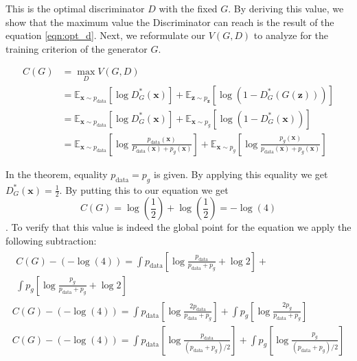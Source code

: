This is the optimal discriminator $D$ with the fixed $G$. By deriving this value, we show that the
maximum value the Discriminator can reach is the result of the equation \ref{eqn:opt_d}. Next, we reformulate our
$V(G, D)$ to analyze for the training criterion of the generator $G$. 

\begin{align}
    C(G) &= \max _{D} V(G, D) \\[5pt]
    & =\mathbb{E}_{\boldsymbol{x} \sim p_{\mathrm{data}}}\left[\log D_{G}^{*}(\boldsymbol{x})\right]+\mathbb{E}_{\boldsymbol{z} \sim p_{\boldsymbol{z}}}\left[\log \left(1-D_{G}^{*}(G(\boldsymbol{z}))\right)\right] \\[5pt]
    & =\mathbb{E}_{\boldsymbol{x} \sim p_{\mathrm{data}}}\left[\log D_{G}^{*}(\boldsymbol{x})\right]+\mathbb{E}_{\boldsymbol{x} \sim p_{g}}\left[\log \left(1-D_{G}^{*}(\boldsymbol{x})\right)\right] \\[5pt]
    & =\mathbb{E}_{\boldsymbol{x} \sim p_{\mathrm{data}}}\left[\log \frac{p_{\mathrm{data}}(\boldsymbol{x})}{P_{\mathrm{data}}(\boldsymbol{x})+p_{g}(\boldsymbol{x})}\right]+\mathbb{E}_{\boldsymbol{x} \sim p_{g}}\left[\log \frac{p_{g}(\boldsymbol{x})}{p_{\mathrm{data}}(\boldsymbol{x})+p_{g}(\boldsymbol{x})}\right] 
\end{align}

In the theorem, equality $ p_{\text{data}} = p_g$ is given. By applying this equality we get
$D^{*}_G(\boldsymbol{x}) = \frac{1}{2}$. By putting this to our equation we get $$C(G) =
\log(\frac{1}{2}) + \log(\frac{1}{2}) = - \log(4)$$. To verify that this value is indeed the global
point for the equation we apply the following subtraction: 
\begin{multline}
    \label{eqn:gan_optim_proof}
    \begin{split}
        C(G)-(-\log (4))  =\int p_{\text {data}}\left[\log \frac{p_{\text {data}}}{p_{\text {data}}+p_{g}}+\log 2\right]+\\ \int p_{g}\left[\log \frac{p_{g}}{p_{\text {data}}+p_{g}}+\log 2\right]
    \end{split}\\[5pt]
    C(G)-(-\log (4)) =\int p_{\text {data}}\left[\log \frac{2 p_{\text {data}}}{p_{\text {data}}+p_{g}}\right]+\int p_{g}\left[\log \frac{2 p_{g}}{p_{\text {data}}+p_{g}}\right]\\[5pt]
    C(G)-(-\log (4)) =\int p_{\text {data}}\left[\log \frac{p_{\text {data}}}{\left(p_{\text {data}}+p_{g}\right) / 2}\right]+\int p_{g}\left[\log \frac{p_{g}}{\left(p_{\text {data}}+p_{g}\right) / 2}\right]
\end{multline}

